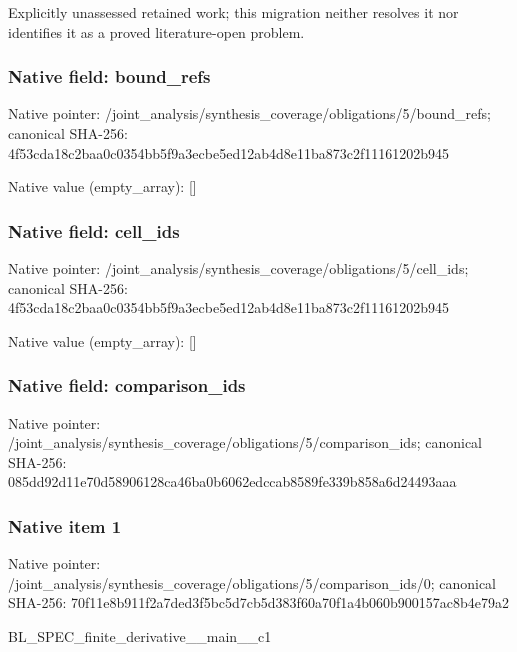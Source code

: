 \documentclass[10pt,a4paper]{article}
\begin{document}
\begingroup\raggedright\sloppy Explicitly unassessed retained work;\allowbreak{} this migration neither resolves it nor identifies it as a proved literature-open problem.\par\endgroup

\subsubsection{Native field: bound\_\allowbreak{}refs}
Native pointer: /joint\_\allowbreak{}analysis/synthesis\_\allowbreak{}coverage/obligations/5/bound\_\allowbreak{}refs; canonical SHA-256: 4f53cda18c2baa0c0354bb5f9a3ecbe5ed12ab4d8e11ba873c2f11161202b945

Native value (empty\_\allowbreak{}array): []

\subsubsection{Native field: cell\_\allowbreak{}ids}
Native pointer: /joint\_\allowbreak{}analysis/synthesis\_\allowbreak{}coverage/obligations/5/cell\_\allowbreak{}ids; canonical SHA-256: 4f53cda18c2baa0c0354bb5f9a3ecbe5ed12ab4d8e11ba873c2f11161202b945

Native value (empty\_\allowbreak{}array): []

\subsubsection{Native field: comparison\_\allowbreak{}ids}
Native pointer: /joint\_\allowbreak{}analysis/synthesis\_\allowbreak{}coverage/obligations/5/comparison\_\allowbreak{}ids; canonical SHA-256: 085dd92d11e70d58906128ca46ba0b6062edccab8589fe339b858a6d24493aaa

\subsubsection{Native item 1}
Native pointer: /joint\_\allowbreak{}analysis/synthesis\_\allowbreak{}coverage/obligations/5/comparison\_\allowbreak{}ids/0; canonical SHA-256: 70f11e8b911f2a7ded3f5bc5d7cb5d383f60a70f1a4b060b900157ac8b4e79a2

\begingroup\raggedright\sloppy BL\_\allowbreak{}SPEC\_\allowbreak{}finite\_\allowbreak{}derivative\_\allowbreak{}\_\allowbreak{}main\_\allowbreak{}\_\allowbreak{}c1\par\endgroup
\end{document}
